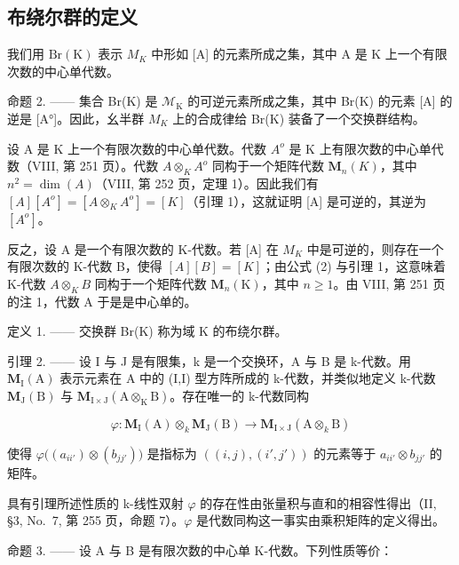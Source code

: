 \subsection{布绕尔群的定义}

我们用 \(\mathrm{Br}(\mathrm{K})\) 表示 \(M_{K}\) 中形如 {[}A{]} 的元素所成之集，其中 A 是 K 上一个有限次数的中心单代数。

命题 2. —— 集合 Br(K) 是 \(\mathcal{M}_{\mathrm{K}}\) 的可逆元素所成之集，其中 Br(K) 的元素 {[}A{]} 的逆是 {[}A°{]}。因此，幺半群 \(M_{K}\) 上的合成律给 Br(K) 装备了一个交换群结构。

设 A 是 K 上一个有限次数的中心单代数。代数 \(A^{o}\) 是 K 上有限次数的中心单代数（VIII, 第 251 页）。代数 \(A \otimes_{K} A^{o}\) 同构于一个矩阵代数 \(\mathbf{M}_{n}(K)\)，其中 \(n^{2} = \dim(A)\)（VIII, 第 252 页，定理 1）。因此我们有 \([A][A^{o}] = [A \otimes_{K} A^{o}] = [K]\)（引理 1），这就证明 {[}A{]} 是可逆的，其逆为 \([A^{o}]\)。

反之，设 A 是一个有限次数的 K-代数。若 {[}A{]} 在 \(M_{K}\) 中是可逆的，则存在一个有限次数的 K-代数 B，使得 \([A][B]=[K]\)；由公式 (2) 与引理 1，这意味着 K-代数 \(A \otimes_{K} B\) 同构于一个矩阵代数 \(\mathbf{M}_{n}(\mathrm{K})\)，其中 \(n \geqslant 1\)。由 VIII, 第 251 页的注 1，代数 A 于是是中心单的。

定义 1. —— 交换群 Br(K) 称为域 K 的布绕尔群。

引理 2. —— 设 I 与 J 是有限集，k 是一个交换环，A 与 B 是 k-代数。用 \(\mathbf{M}_{\mathrm{I}}(\mathrm{A})\) 表示元素在 A 中的 (I,I) 型方阵所成的 k-代数，并类似地定义 k-代数 \(\mathbf{M}_{\mathrm{J}}(\mathrm{B})\) 与 \(\mathbf{M}_{\mathrm{I}\times\mathrm{J}}(\mathrm{A}\otimes_{\mathrm{K}}\mathrm{B})\)。存在唯一的 k-代数同构

\[
\varphi : \mathbf {M} _ {\mathrm{I}} (\mathrm{A}) \otimes_ {k} \mathbf {M} _ {\mathrm{J}} (\mathrm{B}) \longrightarrow \mathbf {M} _ {\mathrm{I} \times \mathrm{J}} (\mathrm{A} \otimes_ {k} \mathrm{B})
\]

使得 \(\varphi\big((a_{ii'})\otimes(b_{jj'})\big)\) 是指标为 \(((i,j),(i',j'))\) 的元素等于 \(a_{ii'}\otimes b_{jj'}\) 的矩阵。

具有引理所述性质的 k-线性双射 \(\varphi\) 的存在性由张量积与直和的相容性得出（II, §3, No.~7, 第 255 页，命题 7）。\(\varphi\) 是代数同构这一事实由乘积矩阵的定义得出。

命题 3. —— 设 A 与 B 是有限次数的中心单 K-代数。下列性质等价：

